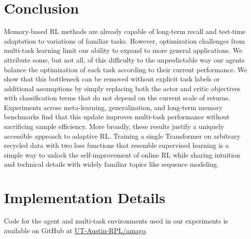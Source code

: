 \documentclass{article}
\begin{document}
\section{Conclusion}
\vspace{-2mm}
Memory-based RL methods are already capable of long-term recall and test-time adaptation to variations of familiar tasks. However, optimization challenges from multi-task learning limit our ability to expand to more general applications. We attribute some, but not all, of this difficulty to the unpredictable way our agents balance the optimization of each task according to their current performance. We show that this bottleneck can be removed without explicit task labels or additional assumptions by simply replacing both the actor and critic objectives with classification terms that do not depend on the current scale of returns. Experiments across meta-learning, generalization, and long-term memory benchmarks find that this update improves multi-task performance without sacrificing sample efficiency. More broadly, these results justify a uniquely accessible approach to adaptive RL. Training a single Transformer on arbitrary recycled data with two loss functions that resemble supervised learning is a simple way to unlock the self-improvement of online RL while sharing intuition and technical details with widely familiar topics like sequence modeling.

\appendix
\newpage
\section{Implementation Details}
\label{app:implementation}
Code for the agent and multi-task environments used in our experiments is available on GitHub at \href{https://github.com/UT-Austin-RPL/amago}{UT-Austin-RPL/amago}.
\end{document}
